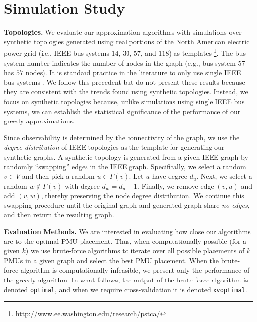 \section{Simulation Study}
\label{sec:simulations}

\textbf{Topologies.} 
We evaluate our approximation algorithms with simulations over synthetic topologies generated using real portions of the North American electric power grid 
(i.e., IEEE bus systems $14$, $30$, $57$, and $118$) as templates {\footnote {\small http://www.ee.washington.edu/research/pstca/}}. 
The bus system number indicates the number of nodes in the graph (e.g., bus system $57$ has $57$ nodes).
It is standard practice in the literature to only use single IEEE bus systems \cite{Baldwin93,Abur06,Mili90,Xu04}.  
We follow this precedent but do not present these results because they are consistent with the trends found using synthetic topologies.
Instead, we focus on synthetic topologies because, unlike simulations using single IEEE bus systems, we can establish the statistical significance of the performance of our greedy approximations.

Since observability is determined by the connectivity of the graph, we use the {\em degree distribution} of IEEE topologies as the template for generating our synthetic graphs.
A synthetic topology is generated from a given IEEE graph by randomly ``swapping'' edges in the IEEE graph. Specifically, we select a random $v \in V$ and then pick a random $u \in \Gamma(v)$. 
Let $u$ have degree $d_u$.  Next, we select a random $w \notin \Gamma(v)$ with degree $d_w = d_u -1$. %
Finally, we remove edge $(v,u)$ and add $(v,w)$, thereby preserving the node degree distribution.
We continue this swapping procedure until the original graph and generated graph share {\em no edges}, and then return the resulting graph.

\textbf{Evaluation Methods.}
We are interested in evaluating how close our algorithms are to the optimal PMU placement. 
Thus, when computationally possible (for a given $k$) we use brute-force algorithms to iterate over all possible placements of $k$ PMUs in a given graph and select the best PMU placement. 
When the brute-force algorithm is computationally infeasible, we present only the performance of the greedy algorithm.
In what follows, the output of the brute-force algorithm is denoted {\tt optimal}, and when we require cross-validation it is denoted {\tt xvoptimal}.


